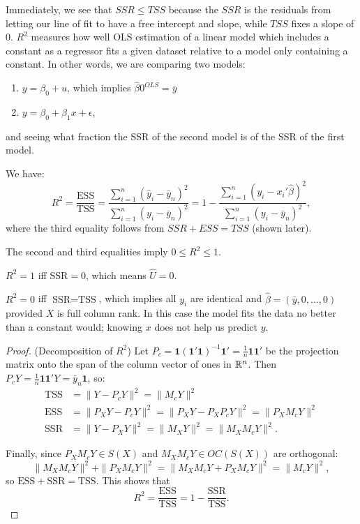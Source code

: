 \begin{remark}	Immediately, we see that $SSR \le TSS$ because the $SSR$ is the residuals from letting our line of fit to have a free intercept and slope, while $TSS$ fixes a slope of $0$.
	$R^2$ measures how well OLS estimation of a linear model which includes a constant as a regressor fits a given dataset relative to a model only containing a constant. In other words, we are comparing two models:
	\begin{enumerate}[label=(\roman*)]
		\item $y = \beta_0 + u$, which implies $\hat{\beta}0^{OLS} = \overline{y}$
		\item $y = \beta_0 + \beta_1 x + \epsilon$,
	\end{enumerate}
	and seeing what fraction the SSR of the second model is of the SSR of the first model.
	

	We have:
	\[
		R^2=\frac{\text{ESS}}{\text{TSS}}=\frac{\sum_{i=1}^n(\hat y_i-\bar y_n)^2}{\sum_{i=1}^n(y_i-\bar y_n)^2}=1-\frac{\sum_{i=1}^n(y_i-x_i'\hat\beta)^2}{\sum_{i=1}^n(y_i-\bar y_n)^2},
	\]
	where the third equality follows from $SSR + ESS = TSS$ (shown later).

	The second and third equalities imply $0\le R^2\le 1$.

	$R^2=1$ iff $\text{SSR}=0$, which means $\hat U=0$.

	$R^2=0$ iff $\text{SSR}=\text{TSS}$, which implies all $y_i$ are identical and $\hat\beta=(\bar y,0,\ldots,0)$ provided $X$ is full column rank. In this case the model fits the data no better than a constant would; knowing $x$ does not help us predict $y$.
\end{remark}

\begin{proof} (Decomposition of $R^2$)
	Let $P_c=\mathbf{1}(\mathbf{1}'\mathbf{1})^{-1}\mathbf{1}'=\frac{1}{n}\mathbf{1}\mathbf{1}'$ be the projection matrix onto the span of the column vector of ones in $\mathbb{R}^n$. Then $P_cY=\frac{1}{n}\mathbf{1}\mathbf{1}'Y=\bar y_n\mathbf{1}$, so:
	\begin{align*}
		\text{TSS}&=\|Y-P_cY\|^2=\|M_cY\|^2 \\
		\text{ESS}&=\|P_XY-P_cY\|^2=\|P_XY-P_XP_cY\|^2=\|P_XM_cY\|^2 \\
		\text{SSR}&=\|Y-P_XY\|^2=\|M_XY\|^2=\|M_XM_cY\|^2.
	\end{align*}

	Finally, since $P_XM_cY \in S(X)$ and $M_XM_cY \in OC(S(X))$ are orthogonal:
	\[
		\|M_XM_cY\|^2+\|P_XM_cY\|^2=\|M_XM_cY+P_XM_cY\|^2=\|M_cY\|^2,
	\]
	so $\text{ESS}+\text{SSR}=\text{TSS}$. This shows that
	\[
		R^2=\frac{\text{ESS}}{\text{TSS}}=1-\frac{\text{SSR}}{\text{TSS}}.
	\]
\end{proof}

